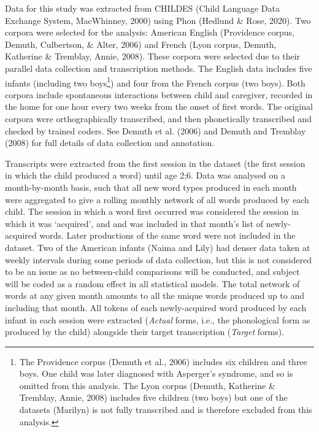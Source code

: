 \documentclass[
  man,mask,floatsintext]{apa6}
\begin{document}
Data for this study was extracted from CHILDES (Child Language Data Exchange System, MacWhinney, 2000) using Phon (Hedlund \& Rose, 2020). Two corpora were selected for the analysis: American English (Providence corpus, Demuth, Culbertson, \& Alter, 2006) and French (Lyon corpus, Demuth, Katherine \& Tremblay, Annie, 2008). These corpora were selected due to their parallel data collection and transcription methods. The English data includes five infants (including two boys\footnote{The Providence corpus (Demuth et al., 2006) includes six children and three boys. One child was later diagnosed with Asperger's syndrome, and so is omitted from this analysis. The Lyon corpus (Demuth, Katherine \& Tremblay, Annie, 2008) includes five children (two boys) but one of the datasets (Marilyn) is not fully transcribed and is therefore excluded from this analysis.}) and four from the French corpus (two boys). Both corpora include spontaneous interactions between child and caregiver, recorded in the home for one hour every two weeks from the onset of first words. The original corpora were orthographically transcribed, and then phonetically transcribed and checked by trained coders. See Demuth et al. (2006) and Demuth and Tremblay (2008) for full details of data collection and annotation.

Transcripts were extracted from the first session in the dataset (the first session in which the child produced a word) until age 2;6. Data was analysed on a month-by-month basis, such that all new word types produced in each month were aggregated to give a rolling monthly network of all words produced by each child. The session in which a word first occurred was considered the session in which it was `acquired', and and was included in that month's list of newly-acquired words. Later productions of the same word were not included in the dataset. Two of the American infants (Naima and Lily) had denser data taken at weekly intervals during some periods of data collection, but this is not considered to be an issue as no between-child comparisons will be conducted, and subject will be coded as a random effect in all statistical models. The total network of words at any given month amounts to all the unique words produced up to and including that month. All tokens of each newly-acquired word produced by each infant in each session were extracted (\emph{Actual} forms, i.e., the phonological form as produced by the child) alongside their target transcription (\emph{Target} forms).
\end{document}
